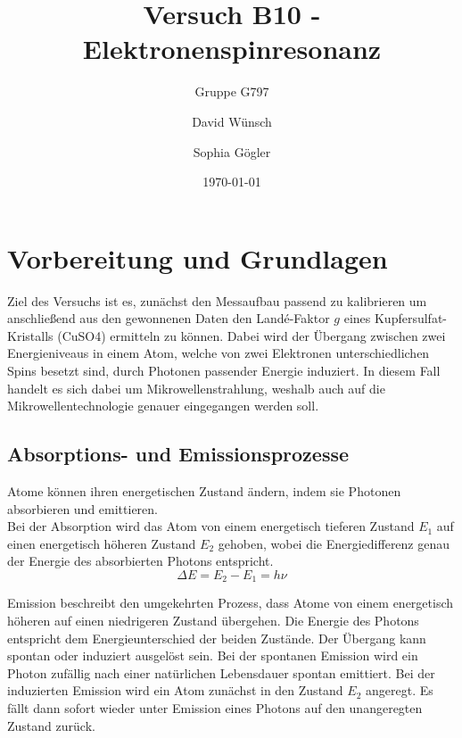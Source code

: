 \documentclass{scrartcl}
\title{Versuch B10 - Elektronenspinresonanz}
\subtitle{Gruppe G797}
\author{David Wünsch \and Sophia Gögler}
\date{\today}
\begin{document}
\maketitle 
\newpage

\tableofcontents
\newpage

\section{Vorbereitung und Grundlagen}

Ziel des Versuchs ist es, zunächst den Messaufbau passend zu kalibrieren um anschließend aus den gewonnenen Daten den Landé-Faktor $g$ eines Kupfersulfat-Kristalls (CuSO4) ermitteln zu können. Dabei wird der Übergang zwischen zwei Energieniveaus in einem Atom, welche von zwei Elektronen unterschiedlichen Spins besetzt sind, durch Photonen passender Energie induziert. In diesem Fall handelt es sich dabei um Mikrowellenstrahlung, weshalb auch auf die Mikrowellentechnologie genauer eingegangen werden soll.

\subsection{Absorptions- und Emissionsprozesse}
Atome können ihren energetischen Zustand ändern, indem sie Photonen absorbieren und emittieren.\\
Bei der Absorption wird das Atom von einem energetisch tieferen Zustand $E_{1}$ auf einen energetisch höheren Zustand $E_{2}$ gehoben, wobei die Energiedifferenz genau der Energie des absorbierten Photons entspricht. 
\begin{equation}
    \label{DeltaE}
    \Delta E = E_{2}-E_{1}=h\nu
\end{equation}

Emission beschreibt den umgekehrten Prozess, dass Atome von einem energetisch höheren auf einen niedrigeren Zustand übergehen. Die Energie des Photons entspricht dem Energieunterschied der beiden Zustände.
Der Übergang kann spontan oder induziert ausgelöst sein. Bei der spontanen Emission wird ein Photon zufällig nach einer natürlichen Lebensdauer spontan emittiert. 
Bei der induzierten Emission wird ein Atom zunächst in den Zustand $E_{2}$ angeregt. Es fällt dann sofort wieder unter Emission eines Photons auf den unangeregten Zustand zurück.
\end{document}
